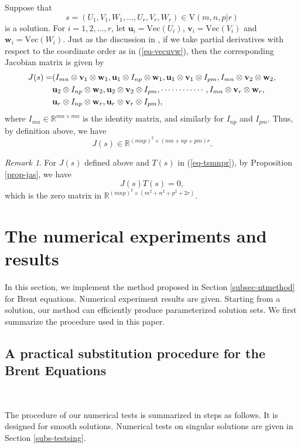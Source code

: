 \documentclass[reqno]{amsart}
\theoremstyle{definition}
\numberwithin{equation}{section}
\theoremstyle{remark}
\newtheorem{remark}[theorem]{Remark}
\begin{document}
Suppose that 
$$s=(U_1,V_1,W_1,\ldots,U_r,V_r,W_r)\in \mathrm{V}(m,n,p|r)$$
is a solution. For $i=1,2,\ldots,r$, let $\mathbf{u}_i=\mathrm{Vec}(U_i)$, $\mathbf{v}_i=\mathrm{Vec}(V_i)$ and $\mathbf{w}_i=\mathrm{Vec}(W_i)$.
Just as the discussion in \cite[Sect. 2.5]{CV25}, if we take partial derivatives with respect to the coordinate order as in
(\ref{eq-vecuvw}), then the corresponding Jacobian matrix is given by
\begin{align}
J(s)=&(I_{mn}\otimes \mathbf{v}_1\otimes \mathbf{w}_1, \mathbf{u}_1\otimes I_{np}\otimes \mathbf{w}_1, 
\mathbf{u}_1\otimes \mathbf{v}_1\otimes I_{pm}, I_{mn}\otimes \mathbf{v}_2\otimes \mathbf{w}_2,\label{eq-js}\\
   & \mathbf{u}_2\otimes I_{np}\otimes \mathbf{w}_2, \mathbf{u}_2\otimes \mathbf{v}_2\otimes I_{pm},\cdots\cdots\cdots\cdots,I_{mn}\otimes \mathbf{v}_r\otimes \mathbf{w}_r,\notag\\
   & \mathbf{u}_r\otimes I_{np}\otimes \mathbf{w}_r, 
\mathbf{u}_r\otimes \mathbf{v}_r\otimes I_{pm}),\notag
\end{align}
where $I_{mn}\in \mathbb{R}^{mn\times mn}$ is the identity matrix, and similarly for
$I_{np}$ and $I_{pm}$. Thus, by definition above, we have 
$$J(s)\in \mathbb{R}^{(mnp)^2\times(mn+np+pm)r}.$$

\begin{remark}
For $J(s)$ defined above and $T(s)$ in (\ref{eq-tsmnpr}), by Proposition
\ref{prop-jas}, we have 
$$J(s)T(s)=0,$$
which is the zero matrix in $\mathbb{R}^{(mnp)^2\times(m^2+n^2+p^2+2r)}$.
\end{remark}


\section{The numerical experiments and results}\label{sec-numtest}

In this section, we implement the method proposed in Section \ref{subsec-ntmethod} for Brent equations. Numerical experiment results are given. Starting from a solution, our method can efficiently produce parameterized solution sets. We first summarize the procedure used in this paper.

\subsection{A practical substitution procedure for the Brent Equations}\label{subs-subsprocedure}
\

The procedure of our numerical tests is summarized in steps as follows. It is designed for smooth solutions. Numerical tests on singular solutions are given in Section \ref{subs-testsing}.
\end{document}
